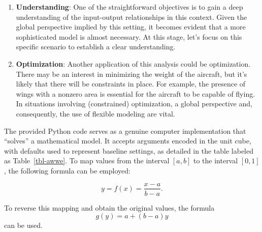 \documentclass[
  letterpaper,
  DIV=11,
  numbers=noendperiod]{scrreprt}
\begin{document}
\begin{enumerate}
\def\labelenumi{\arabic{enumi}.}
\item
  \textbf{Understanding}: One of the straightforward objectives is to
  gain a deep understanding of the input-output relationships in this
  context. Given the global perspective implied by this setting, it
  becomes evident that a more sophisticated model is almost necessary.
  At this stage, let's focus on this specific scenario to establish a
  clear understanding.
\item
  \textbf{Optimization}: Another application of this analysis could be
  optimization. There may be an interest in minimizing the weight of the
  aircraft, but it's likely that there will be constraints in place. For
  example, the presence of wings with a nonzero area is essential for
  the aircraft to be capable of flying. In situations involving
  (constrained) optimization, a global perspective and, consequently,
  the use of flexible modeling are vital.
\end{enumerate}

The provided Python code serves as a genuine computer implementation
that ``solves'' a mathematical model. It accepts arguments encoded in
the unit cube, with defaults used to represent baseline settings, as
detailed in the table labeled as Table~\ref{tbl-awwe}. To map values
from the interval \([a, b]\) to the interval \([0, 1]\), the following
formula can be employed:

\[y = f(x) = \frac{x - a}{b - a}.\]

To reverse this mapping and obtain the original values, the formula
\[g(y) = a + (b - a) y\] can be used.
\end{document}

